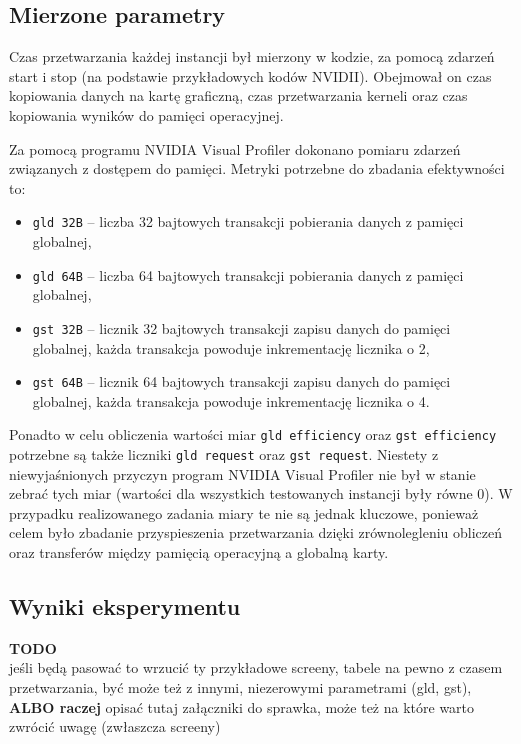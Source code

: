 \documentclass[12pt,a4paper]{article}
\begin{document}
\subsection{Mierzone parametry}

Czas przetwarzania każdej instancji był mierzony w kodzie, za pomocą zdarzeń start i stop (na podstawie przykładowych kodów NVIDII). Obejmował on czas kopiowania danych na kartę graficzną, czas przetwarzania kerneli oraz czas kopiowania wyników do pamięci operacyjnej.

Za pomocą programu NVIDIA Visual Profiler dokonano pomiaru zdarzeń związanych z dostępem do pamięci. Metryki potrzebne do zbadania efektywności to: 
\begin{itemize}
\item \verb|gld 32B| -- liczba 32 bajtowych transakcji pobierania danych z pamięci globalnej,
\item \verb|gld 64B| -- liczba 64 bajtowych transakcji pobierania danych z pamięci globalnej,
\item \verb|gst 32B| -- licznik 32 bajtowych transakcji zapisu danych do pamięci globalnej, każda transakcja powoduje inkrementację licznika o 2,
\item \verb|gst 64B| -- licznik 64 bajtowych transakcji zapisu danych do pamięci globalnej, każda transakcja powoduje inkrementację licznika o 4.
\end{itemize}

Ponadto w celu obliczenia wartości miar \verb|gld efficiency| oraz \verb|gst efficiency| potrzebne są także liczniki  \verb|gld request| oraz  \verb|gst request|. Niestety z niewyjaśnionych przyczyn program NVIDIA Visual Profiler nie był w stanie zebrać tych  miar (wartości dla wszystkich testowanych instancji były równe 0). W przypadku realizowanego zadania miary te nie są jednak kluczowe, ponieważ celem było zbadanie przyspieszenia przetwarzania dzięki zrównolegleniu obliczeń oraz transferów między pamięcią operacyjną a globalną karty.


\subsection{Wyniki eksperymentu}

\textbf{TODO}\\
jeśli będą pasować to wrzucić ty przykładowe screeny, tabele na pewno z czasem przetwarzania, być może też z innymi, niezerowymi parametrami (gld, gst), \textbf{ALBO raczej} opisać tutaj załączniki do sprawka, może też na które warto zwrócić uwagę (zwłaszcza screeny)
\end{document}
